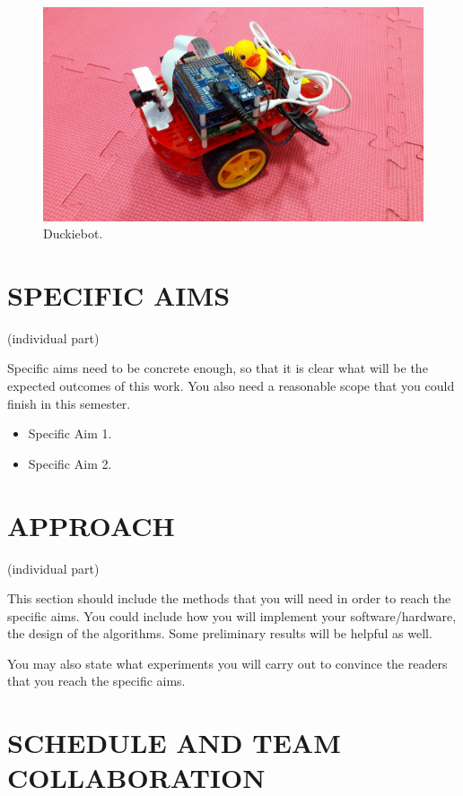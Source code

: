 \documentclass[letterpaper, 10 pt, conference]{ieeeconf}  %
\begin{document}
\begin{figure}[t] %
\includegraphics[width=0.8\columnwidth]{duckiebot}
\centering
\caption{Duckiebot.}
 \label{figure:duckiebot}
\end{figure}

\section{SPECIFIC AIMS}

(individual part)

Specific aims need to be concrete enough, so that it is clear what will be the expected outcomes of this work. You also need a reasonable scope that you could finish in this semester.

\begin{itemize}
\item Specific Aim 1.
\item Specific Aim 2.
\end{itemize}

\section{APPROACH}

(individual part)

This section should include the methods that you will need in order to reach the specific aims. You could include how you will implement your software/hardware, the design of the algorithms. Some preliminary results will be helpful as well. 

You may also state what experiments you will carry out to convince the readers that you reach the specific aims.

\section{SCHEDULE AND TEAM COLLABORATION}
\end{document}
